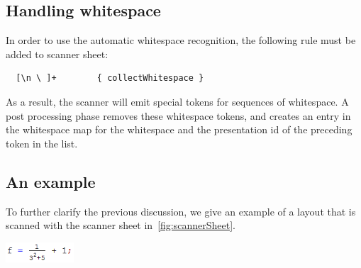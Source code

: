 \documentclass[12pt]{article}
\begin{document}
\subsection{Handling whitespace}

In order to use the automatic whitespace recognition, the following rule must be added to scanner sheet:

\begin{footnotesize}
\begin{verbatim}
  [\n \ ]+        { collectWhitespace }
\end{verbatim} %
\end{footnotesize}

As a result, the scanner will emit special tokens for sequences of whitespace. A post processing phase removes these whitespace tokens, and creates an entry in the whitespace map for the whitespace and the presentation id of the preceding token in the list. 


\subsection{An example}

To further clarify the previous discussion, we give an example of a layout that is scanned with the scanner sheet in~\ref{fig:scannerSheet}.

\begin{center}
\includegraphics[width=1in]{images/scanFrac}\
\end{center}
\end{document}

